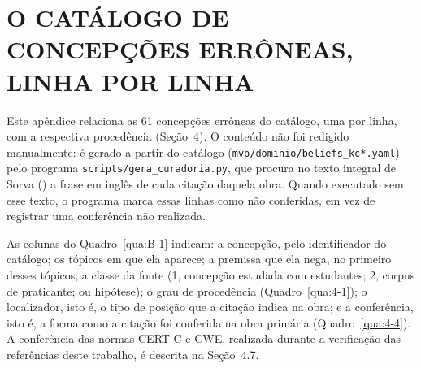 
\chapter{\texorpdfstring{\mbox{O} \mbox{CATÁLOGO} \mbox{DE} \mbox{CONCEPÇÕES} \mbox{ERRÔNEAS,} \mbox{LINHA} \mbox{POR} \mbox{LINHA}}{O CATÁLOGO DE CONCEPÇÕES ERRÔNEAS, LINHA POR LINHA}}\label{cap:B}

Este apêndice relaciona as 61 concepções errôneas do catálogo, uma por linha, com a respectiva procedência (Seção~4). O conteúdo não foi redigido manualmente: é gerado a partir do catálogo (\texttt{mvp/\allowbreak{}dominio/\allowbreak{}beliefs\_\allowbreak{}kc*.\allowbreak{}yaml}) pelo programa \texttt{scripts/\allowbreak{}gera\_\allowbreak{}curadoria.\allowbreak{}py}, que procura no texto integral de Sorva (\citeyear{sorva2012}) a frase em inglês de cada citação daquela obra. Quando executado sem esse texto, o programa marca essas linhas como não conferidas, em vez de registrar uma conferência não realizada.

As colunas do Quadro~\ref{qua:B-1} indicam: a concepção, pelo identificador do catálogo; os tópicos em que ela aparece; a premissa que ela nega, no primeiro desses tópicos; a classe da fonte (1, concepção estudada com estudantes; 2, corpus de praticante; ou hipótese); o grau de procedência (Quadro~\ref{qua:4-1}); o localizador, isto é, o tipo de posição que a citação indica na obra; e a conferência, isto é, a forma como a citação foi conferida na obra primária (Quadro~\ref{qua:4-4}). A conferência das normas CERT C e CWE, realizada durante a verificação das referências deste trabalho, é descrita na Seção~4.7.

